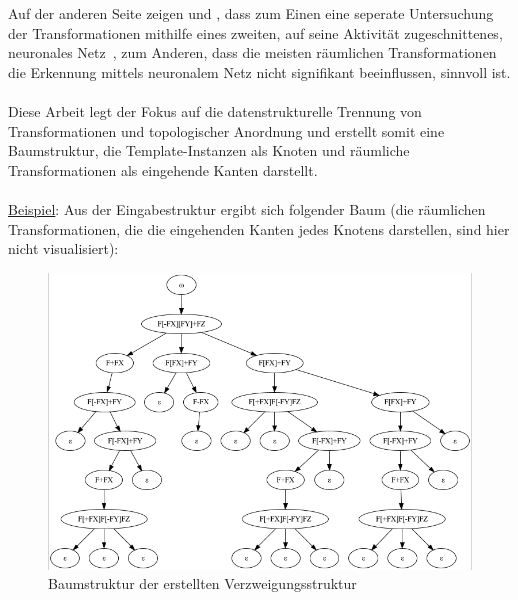 \newpage

Auf der anderen Seite zeigen \citeauthor{nishida_2016} und \citeauthor{guo_2020},
dass zum Einen eine seperate Untersuchung der Transformationen mithilfe eines zweiten,
auf seine Aktivität zugeschnittenes, neuronales Netz~\cite{nishida_2016}, zum Anderen, dass die meisten
räumlichen Transformationen die Erkennung mittels neuronalem Netz nicht signifikant beeinflussen,
sinnvoll ist.\\~\\
Diese Arbeit legt der Fokus auf die datenstrukturelle Trennung von Transformationen und topologischer
Anordnung und erstellt somit eine Baumstruktur, die Template-Instanzen als Knoten und
räumliche Transformationen als eingehende Kanten darstellt.\\~\\
\underline{Beispiel}: Aus der Eingabestruktur ergibt sich folgender Baum (die räumlichen Transformationen,
die die eingehenden Kanten jedes Knotens darstellen, sind hier nicht visualisiert):
\begin{figure}[H]
    \centering
    \includegraphics[width=12cm]{../images/evaluierung_inferrieren_baum.png}
    \caption{Baumstruktur der erstellten Verzweigungsstruktur}
\end{figure}

